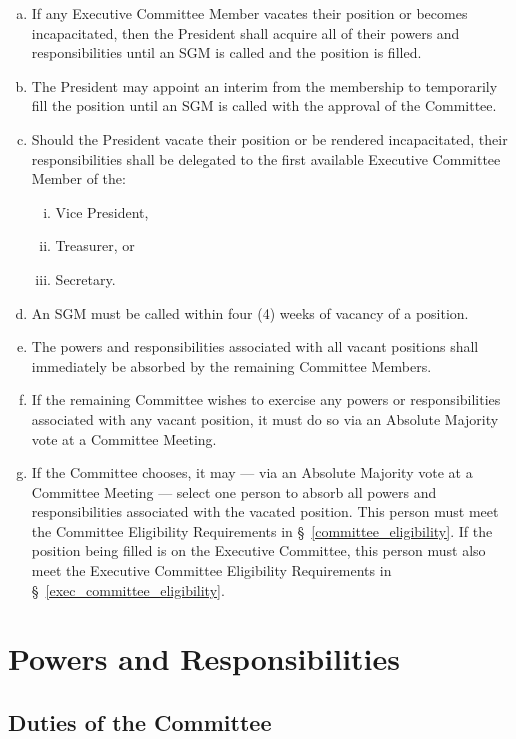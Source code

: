 \documentclass[a4paper,12pt]{article}
\begin{document}
\begin{enumerate}[a)]
	\item If any Executive Committee Member vacates their position or becomes incapacitated, then the President shall acquire all of their powers and responsibilities until an SGM is called and the position is filled.
	\item The President may appoint an interim from the membership to temporarily fill the position until an SGM is called with the approval of the Committee.
	\item Should the President vacate their position or be rendered incapacitated, their responsibilities shall be delegated to the first available Executive Committee Member of the:
	\begin{enumerate}[i)]
		\item Vice President,
		\item Treasurer, or
		\item Secretary.
	\end{enumerate}
	\item An SGM must be called within four (4) weeks of vacancy of a position.
	\item The powers and responsibilities associated with all vacant positions shall immediately be absorbed by the remaining Committee Members.
	\item If the remaining Committee wishes to exercise any powers or responsibilities associated with any vacant position, it must do so via an Absolute Majority vote at a Committee Meeting.
	\item If the Committee chooses, it may --- via an Absolute Majority vote at a Committee Meeting --- select one person to absorb all powers and responsibilities associated with the vacated position. This person must meet the Committee Eligibility Requirements in \S~\ref{committee_eligibility}. If the position being filled is on the Executive Committee, this person must also meet the Executive Committee Eligibility Requirements in \S~\ref{exec_committee_eligibility}.
\end{enumerate}

\section{Powers and Responsibilities}

\subsection{Duties of the Committee}
\end{document}
